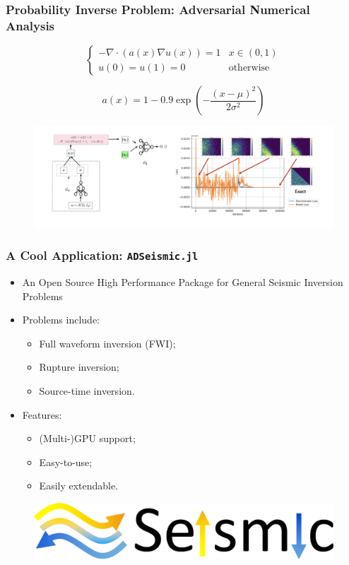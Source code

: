 \documentclass{beamer}
\begin{document}
\begin{frame}
	\frametitle{Probability Inverse Problem: Adversarial Numerical Analysis}
	
		\begin{equation*}
			\begin{cases}     -\nabla \cdot (a(x)\nabla u(x)) = 1 & x\in(0,1)\\
    u(0) = u(1) = 0 & \mbox{otherwise} \end{cases}
		\end{equation*}
		
		\begin{equation*}
			a(x) = 1-0.9\exp\left( -\frac{(x-\mu)^2}{2\sigma^2} \right)
		\end{equation*}

\begin{figure}[hbt]
	 \includegraphics[width=1.0\textwidth]{../ana.png}
\end{figure}
\end{frame}

\begin{frame}
	\frametitle{A Cool Application: \texttt{ADSeismic.jl}}
	\begin{itemize}
		\item An Open Source High Performance Package for General Seismic Inversion Problems
		\item Problems include:
		\begin{itemize}
		\item Full waveform inversion (FWI);
\item Rupture inversion;
\item Source-time inversion.
		\end{itemize}
		\item Features:
		\begin{itemize}
		\item (Multi-)GPU support;
		\item Easy-to-use;
		\item Easily extendable.
		\end{itemize}
	\end{itemize}
	
	\begin{figure}[hbt]
	 \includegraphics[width=1.0\textwidth]{../adseismic.png}
\end{figure}
\end{frame}


\end{document}
